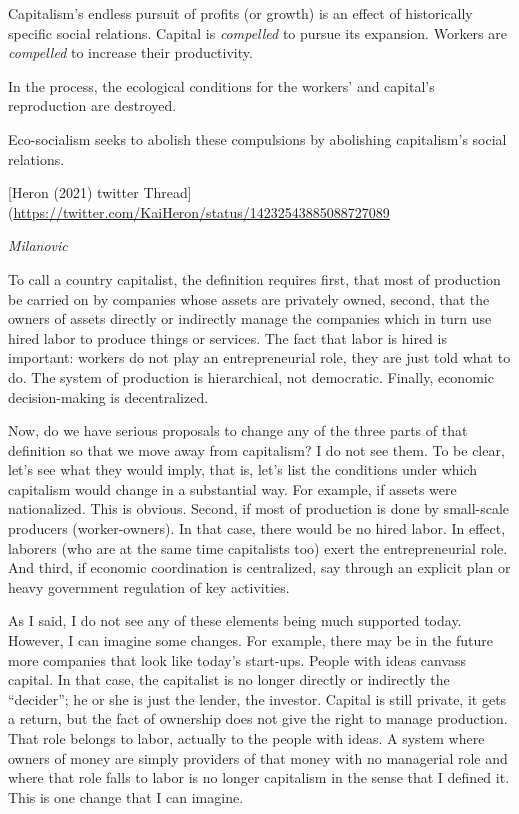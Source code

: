 \documentclass[
]{book}
\begin{document}
Capitalism's endless pursuit of profits (or growth) is an effect of historically specific social relations. Capital is \emph{compelled} to pursue its expansion. Workers are \emph{compelled} to increase their productivity.

In the process, the ecological conditions for the workers' and capital's reproduction are destroyed.

Eco-socialism seeks to abolish these compulsions by abolishing capitalism's social relations.

{[}Heron (2021) twitter Thread{]}(\url{https://twitter.com/KaiHeron/status/14232543885088727089}

\emph{Milanovic}

To call a country capitalist, the definition requires first, that most of production be carried on by companies whose assets are privately owned, second, that the owners of assets directly or indirectly manage the companies which in turn use hired labor to produce things or services. The fact that labor is hired is important: workers do not play an entrepreneurial role, they are just told what to do. The system of production is hierarchical, not democratic. Finally, economic decision-making is decentralized.

Now, do we have serious proposals to change any of the three parts of that definition so that we move away from capitalism? I do not see them. To be clear, let's see what they would imply, that is, let's list the conditions under which capitalism would change in a substantial way. For example, if assets were nationalized. This is obvious. Second, if most of production is done by small-scale producers (worker-owners). In that case, there would be no hired labor. In effect, laborers (who are at the same time capitalists too) exert the entrepreneurial role. And third, if economic coordination is centralized, say through an explicit plan or heavy government regulation of key activities.

As I said, I do not see any of these elements being much supported today. However, I can imagine some changes. For example, there may be in the future more companies that look like today's start-ups. People with ideas canvass capital. In that case, the capitalist is no longer directly or indirectly the ``decider''; he or she is just the lender, the investor. Capital is still private, it gets a return, but the fact of ownership does not give the right to manage production. That role belongs to labor, actually to the people with ideas. A system where owners of money are simply providers of that money with no managerial role and where that role falls to labor is no longer capitalism in the sense that I defined it. This is one change that I can imagine.
\end{document}
